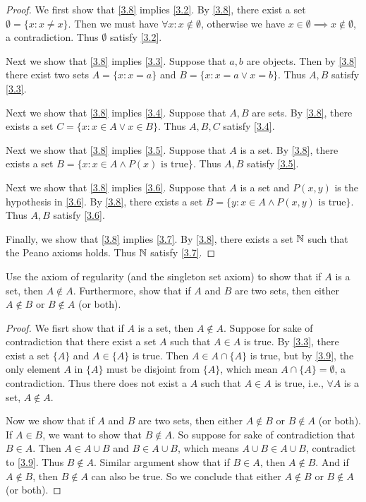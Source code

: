 \begin{proof}
  We first show that \cref{3.8} implies \cref{3.2}.
  By \cref{3.8}, there exist a set \(\emptyset = \{x: x \neq x\}\).
  Then we must have \(\forall x : x \notin \emptyset\), otherwise we have \(x \in \emptyset \implies x \notin \emptyset\), a contradiction.
  Thus \(\emptyset\) satisfy \cref{3.2}.

  Next we show that \cref{3.8} implies \cref{3.3}.
  Suppose that \(a, b\) are objects.
  Then by \cref{3.8} there exist two sets \(A = \{x: x = a\}\) and \(B = \{x: x = a \lor x = b\}\).
  Thus \(A, B\) satisfy \cref{3.3}.

  Next we show that \cref{3.8} implies \cref{3.4}.
  Suppose that \(A, B\) are sets.
  By \cref{3.8}, there exists a set \(C = \{x : x \in A \lor x \in B\}\).
  Thus \(A, B, C\) satisfy \cref{3.4}.

  Next we show that \cref{3.8} implies \cref{3.5}.
  Suppose that \(A\) is a set.
  By \cref{3.8}, there exists a set \(B = \{x : x \in A \land P(x) \text{ is true}\}\).
  Thus \(A, B\) satisfy \cref{3.5}.

  Next we show that \cref{3.8} implies \cref{3.6}.
  Suppose that \(A\) is a set and \(P(x, y)\) is the hypothesis in \cref{3.6}.
  By \cref{3.8}, there exists a set \(B = \{y :  x \in A \land P(x, y) \text{ is true}\}\).
  Thus \(A, B\) satisfy \cref{3.6}.

  Finally, we show that \cref{3.8} implies \cref{3.7}.
  By \cref{3.8}, there exists a set \(\mathbb{N}\) such that the Peano axioms holds.
  Thus \(\mathbb{N}\) satisfy \cref{3.7}.
\end{proof}

\begin{ex}\label{ex:3.2.2}
  Use the axiom of regularity (and the singleton set axiom) to show that if \(A\) is a set, then \(A \notin A\).
  Furthermore, show that if \(A\) and \(B\) are two sets, then either \(A \notin B\) or \(B \notin A\) (or both).
\end{ex}

\begin{proof}
  We fisrt show that if \(A\) is a set, then \(A \notin A\).
  Suppose for sake of contradiction that there exist a set \(A\) such that \(A \in A\) is true.
  By \cref{3.3}, there exist a set \(\{A\}\) and \(A \in \{A\}\) is true.
  Then \(A \in A \cap \{A\}\) is true, but by \cref{3.9}, the only element \(A\) in \(\{A\}\) must be disjoint from \(\{A\}\), which mean \(A \cap \{A\} = \emptyset\), a contradiction.
  Thus there does not exist a \(A\) such that \(A \in A\) is true, i.e., \(\forall A\) is a set, \(A \notin A\).

  Now we show that if \(A\) and \(B\) are two sets, then either \(A \notin B\) or \(B \notin A\) (or both).
  If \(A \in B\), we want to show that \(B \notin A\).
  So suppose for sake of contradiction that \(B \in A\).
  Then \(A \in A \cup B\) and \(B \in A \cup B\), which means \(A \cup B \in A \cup B\), contradict to \cref{3.9}.
  Thus \(B \notin A\).
  Similar argument show that if \(B \in A\), then \(A \notin B\).
  And if \(A \notin B\), then \(B \notin A\) can also be true.
  So we conclude that either \(A \notin B\) or \(B \notin A\) (or both).
\end{proof}

